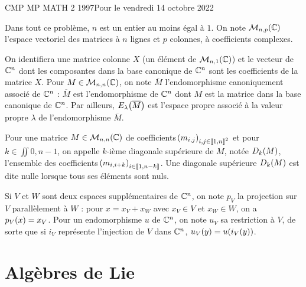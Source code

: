 \documentclass[a4paper,french,bookmarks]{article}
\begin{document}
    \renewcommand{\thesection}{\Roman{section}}
    \renewcommand{\thesection}{\Roman{section}}
    \renewcommand{\labelenumi}{\Roman{section}.\arabic{enumi}.}
    \renewcommand*{\labelenumii}{\alph{enumii}.}

    {CMP MP MATH 2 1997}{Pour le vendredi 14 octobre 2022}
    
    \begin{enumerate}
        \itt Dans tout ce problème, $n$ est un entier au moins égal à $1$. On note $\mathcal{M}_{n, p}\!\left(\mathbb{C}\right)$ l'espace vectoriel des matrices à $n$ lignes et $p$ colonnes, à coefficients complexes.
    
        \itt On identifiera une matrice colonne $X$ (un élément de $\mathcal{M}_{n, 1}\!\left(\mathbb{C}\right)$) et le vecteur de $\mathbb{C}^n$ dont les composantes dans la base canonique de $\mathbb{C}^n$ sont les coefficients de la matrice $X$. Pour $M \in \mathcal{M}_{n, n}\!\left(\mathbb{C}\right)$, on note $\overline M$ l'endomorphisme canoniquement associé de $\mathbb{C}^n$ : $\overline M$ est l'endomorphisme de $\mathbb{C}^n$ dont $M$ est la matrice dans la base canonique de $\mathbb{C}^n$. Par ailleurs, $E_\lambda\!\left(\overline M\right)$ est l'espace propre associé à la valeur propre $\lambda$ de l'endomorphisme $\overline M$.
    
        \itt Pour une matrice $M \in \mathcal{M}_{n, n}\!\left(\mathbb{C}\right)$ de coefficients $\!\left(m_{i, j}\right)_{i, j \in \left\llbracket1, n\right\rrbracket^2}$ et pour $k \in \iint{0, n-1}$, on appelle $k$-ième diagonale supérieure de $M$, notée $D_k\!\left(M\right)$, l'ensemble des coefficients $\!\left(m_{i, i+k}\right)_{i \in \left\llbracket1, n-k\right\rrbracket}$. Une diagonale supérieure $D_k\!\left(M\right)$ est dite nulle lorsque tous ses éléments sont nuls.
    
        \itt Si $V$ et $W$ sont deux espaces supplémentaires de $\mathbb{C}^n$, on note $p_V$ la projection sur $V$ parallèlement à $W$ : pour $x = x_V +x_W$ avec $x_V \in V$ et $x_W \in W$, on a $p_V\!\left(x\right) = x_V$. Pour un endomorphisme $u$ de $\mathbb{C}^n$, on note $u_V$ sa restriction à $V$, de sorte que si $i_V$ représente l'injection de $V$ dans $\mathbb{C}^n$, $u_V\!\left(y\right) = u\!\left(i_V\!\left(y\right)\right)$.
    \end{enumerate}
    
    \section{Algèbres de Lie}
    
\end{document}
